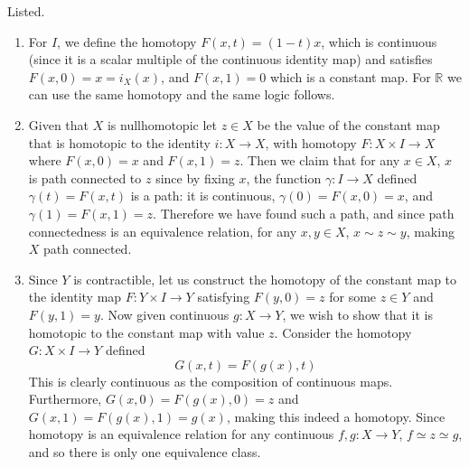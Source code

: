   \begin{solution}
    Listed. 
    \begin{enumerate}
      \item For $I$, we define the homotopy $F(x, t) = (1 - t)x$, which is continuous (since it is a scalar multiple of the continuous identity map) and satisfies $F(x, 0) = x = i_X(x)$, and $F(x, 1) = 0$ which is a constant map. For $\mathbb{R}$ we can use the same homotopy and the same logic follows. 

      \item Given that $X$ is nullhomotopic let $z \in X$ be the value of the constant map that is homotopic to the identity $i: X \rightarrow X$, with homotopy $F: X \times I \rightarrow X$ where $F(x, 0) = x$ and $F(x, 1) = z$. Then we claim that for any $x \in X$, $x$ is path connected to $z$ since by fixing $x$, the function $\gamma: I \rightarrow X$ defined $\gamma(t) = F(x, t)$ is a path: it is continuous, $\gamma(0) = F(x, 0) = x$, and $\gamma(1) = F(x, 1) = z$. Therefore we have found such a path, and since path connectedness is an equivalence relation, for any $x, y \in X$, $x \sim z \sim y$, making $X$ path connected. 

      \item Since $Y$ is contractible, let us construct the homotopy of the constant map to the identity map $F: Y \times I \rightarrow Y$ satisfying $F(y, 0) = z$ for some $z \in Y$ and $F(y, 1) = y$. Now given continuous $g: X \rightarrow Y$, we wish to show that it is homotopic to the constant map with value $z$. Consider the homotopy $G: X \times I \rightarrow Y$ defined 
      \begin{equation}
        G(x, t) = F(g(x), t)
      \end{equation}
      This is clearly continuous as the composition of continuous maps. Furthermore, $G(x, 0) = F(g(x), 0) = z$ and $G(x, 1) = F(g(x), 1) = g(x)$, making this indeed a homotopy. Since homotopy is an equivalence relation for any continuous $f, g: X \rightarrow Y$, $f \simeq z \simeq g$, and so there is only one equivalence class. 


\end{enumerate}
\end{solution}
